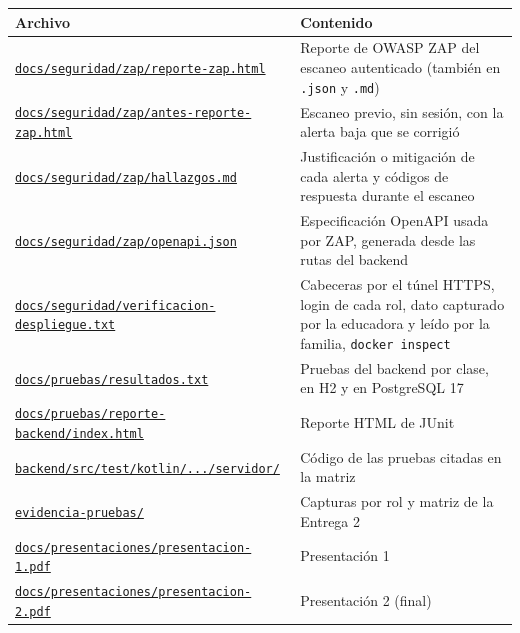 {\small
\begin{longtable}{p{7.2cm}p{7.6cm}}
\toprule
\textbf{Archivo} & \textbf{Contenido}\\\midrule\endhead
\href{\gh/blob/v3.0-entrega-final/docs/seguridad/zap/reporte-zap.html}{\texttt{docs/seguridad/zap/reporte-zap.html}} & Reporte de OWASP ZAP del escaneo autenticado (también en \texttt{.json} y \texttt{.md})\\
\href{\gh/blob/v3.0-entrega-final/docs/seguridad/zap/antes-reporte-zap.html}{\texttt{docs/seguridad/zap/antes-reporte-zap.html}} & Escaneo previo, sin sesión, con la alerta baja que se corrigió\\
\href{\gh/blob/v3.0-entrega-final/docs/seguridad/zap/hallazgos.md}{\texttt{docs/seguridad/zap/hallazgos.md}} & Justificación o mitigación de cada alerta y códigos de respuesta durante el escaneo\\
\href{\gh/blob/v3.0-entrega-final/docs/seguridad/zap/openapi.json}{\texttt{docs/seguridad/zap/openapi.json}} & Especificación OpenAPI usada por ZAP, generada desde las rutas del backend\\
\href{\gh/blob/v3.0-entrega-final/docs/seguridad/verificacion-despliegue.txt}{\texttt{docs/seguridad/verificacion-despliegue.txt}} & Cabeceras por el túnel HTTPS, login de cada rol, dato capturado por la educadora y leído por la familia, \texttt{docker inspect}\\
\href{\gh/blob/v3.0-entrega-final/docs/pruebas/resultados.txt}{\texttt{docs/pruebas/resultados.txt}} & Pruebas del backend por clase, en H2 y en PostgreSQL 17\\
\href{\gh/tree/v3.0-entrega-final/docs/pruebas/reporte-backend}{\texttt{docs/pruebas/reporte-backend/index.html}} & Reporte HTML de JUnit\\
\href{\gh/tree/v3.0-entrega-final/backend/src/test/kotlin/mx/tec/sonrisas/servidor}{\texttt{backend/src/test/kotlin/.../servidor/}} & Código de las pruebas citadas en la matriz\\
\href{\gh/tree/v3.0-entrega-final/evidencia-pruebas}{\texttt{evidencia-pruebas/}} & Capturas por rol y matriz de la Entrega 2\\
\href{\gh/blob/v3.0-entrega-final/docs/presentaciones/presentacion-1.pdf}{\texttt{docs/presentaciones/presentacion-1.pdf}} & Presentación 1\\
\href{\gh/blob/v3.0-entrega-final/docs/presentaciones/presentacion-2.pdf}{\texttt{docs/presentaciones/presentacion-2.pdf}} & Presentación 2 (final)\\
\bottomrule
\end{longtable}}
